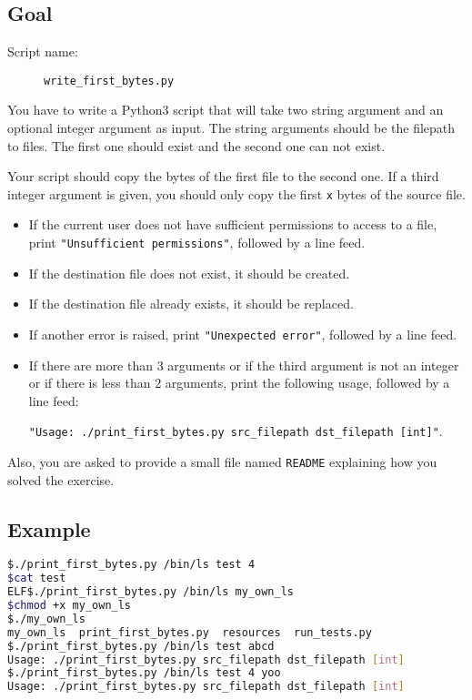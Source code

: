 \documentclass[12pt]{article}
\begin{document}
\subsection{Goal}

\begin{description}
        \item[Script name:] \texttt{write\_first\_bytes.py}
\end{description}

You have to write a Python3 script that will take two string argument and an optional integer argument as input. The string arguments should be  the filepath to files. The first one should exist and the second one can not exist.

Your script should copy the bytes of the first file to the second one. If a third integer argument is given, you should only copy the first \texttt{x} bytes of the source file.

\begin{itemize}
\item If the current user does not have sufficient permissions to access to a file, print \texttt{"Unsufficient permissions"}, followed by a line feed.

\item If the destination file does not exist, it should be created.

\item If the destination file already exists, it should be replaced.

\item If another error is raised, print \texttt{"Unexpected error"}, followed by a line feed.

\item If there are more than 3 arguments or if the third argument is not an integer or if there is less than 2 arguments, print the following usage, followed by a line feed:

\texttt{"Usage: ./print\_first\_bytes.py src\_filepath dst\_filepath [int]"}.
\end{itemize}

Also, you are asked to provide a small file named \texttt{README} explaining how you solved the exercise.

\subsection{Example}

\begin{lstlisting}[language=bash]
$./print_first_bytes.py /bin/ls test 4
$cat test 
ELF$./print_first_bytes.py /bin/ls my_own_ls
$chmod +x my_own_ls 
$./my_own_ls 
my_own_ls  print_first_bytes.py  resources  run_tests.py
$./print_first_bytes.py /bin/ls test abcd
Usage: ./print_first_bytes.py src_filepath dst_filepath [int]
$./print_first_bytes.py /bin/ls test 4 yoo
Usage: ./print_first_bytes.py src_filepath dst_filepath [int]
\end{lstlisting}
\end{document}
